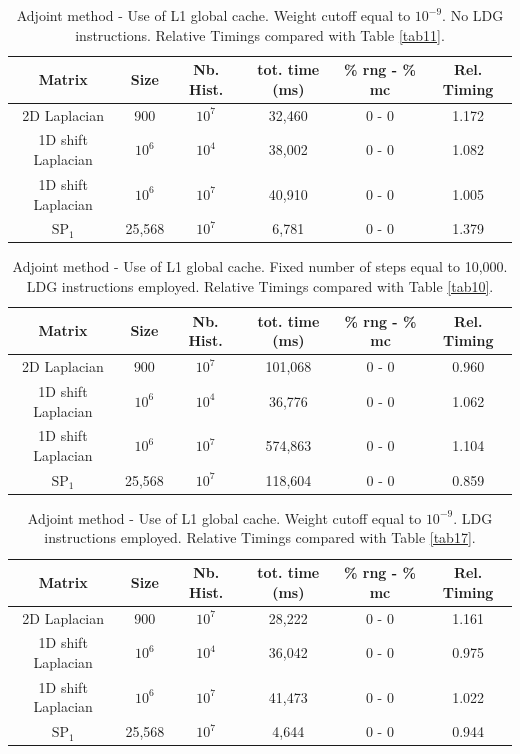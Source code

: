 \documentclass[a4paper,10pt]{article}
\begin{document}
\begin{table}[!h]
\begin{tabular}{|c|c|c|c|c|c|}
\hline
\textbf{Matrix} & \textbf{Size} &\textbf{Nb. Hist.} & tot. time (ms)& \% rng - 
\% mc & Rel. Timing\\
\hline
2D Laplacian& 900 & $10^7$ & 32,460 & 0 - 0 & 1.172 \\
\hline 
1D shift Laplacian& $10^6$ & $10^4$ &  38,002 & 0 - 0 & 1.082\\
\hline
1D shift Laplacian& $10^6$ & $10^7$ & 40,910 & 0 - 0 & 1.005\\
\hline
$\text{SP}_1$ & 25,568 & $10^7$ & 6,781 & 0 - 0 & 1.379\\
\hline
\end{tabular}
\caption{Adjoint method - Use of L1 global cache. Weight cutoff equal to 
$10^{-9}$. No LDG instructions. Relative Timings compared with Table 
\ref{tab11}.} 
\label{tab33}
\end{table}


\begin{table}[!h]
\begin{tabular}{|c|c|c|c|c|c|}
\hline
\textbf{Matrix} & \textbf{Size} &\textbf{Nb. Hist.} & tot. time (ms)& \% rng - 
\% mc & Rel. Timing\\
\hline
2D Laplacian& 900 & $10^7$ & 101,068 & 0 - 0 & 0.960 \\
\hline 
1D shift Laplacian& $10^6$ & $10^4$ &  36,776 & 0 - 0 & 1.062\\
\hline
1D shift Laplacian& $10^6$ & $10^7$ & 574,863 & 0 - 0 & 1.104\\
\hline
$\text{SP}_1$ & 25,568 & $10^7$ & 118,604 & 0 - 0 & 0.859\\
\hline
\end{tabular}
\caption{Adjoint method - Use of L1 global cache. Fixed number of steps equal 
to 10,000. LDG instructions employed. Relative Timings compared with Table 
\ref{tab10}.} 
\label{tab34}
\end{table}


\begin{table}[!h]
\begin{tabular}{|c|c|c|c|c|c|}
\hline
\textbf{Matrix} & \textbf{Size} &\textbf{Nb. Hist.} & tot. time (ms)& \% rng - 
\% mc & Rel. Timing\\
\hline
2D Laplacian& 900 & $10^7$ & 28,222 & 0 - 0 & 1.161 \\
\hline 
1D shift Laplacian& $10^6$ & $10^4$ &  36,042 & 0 - 0 & 0.975\\
\hline
1D shift Laplacian& $10^6$ & $10^7$ & 41,473 & 0 - 0 & 1.022\\
\hline
$\text{SP}_1$ & 25,568 & $10^7$ & 4,644 & 0 - 0 & 0.944\\
\hline
\end{tabular}
\caption{Adjoint method - Use of L1 global cache. Weight cutoff equal to 
$10^{-9}$. LDG instructions employed. Relative Timings compared with Table 
\ref{tab17}.} 
\label{tab35}
\end{table}
\end{document}
